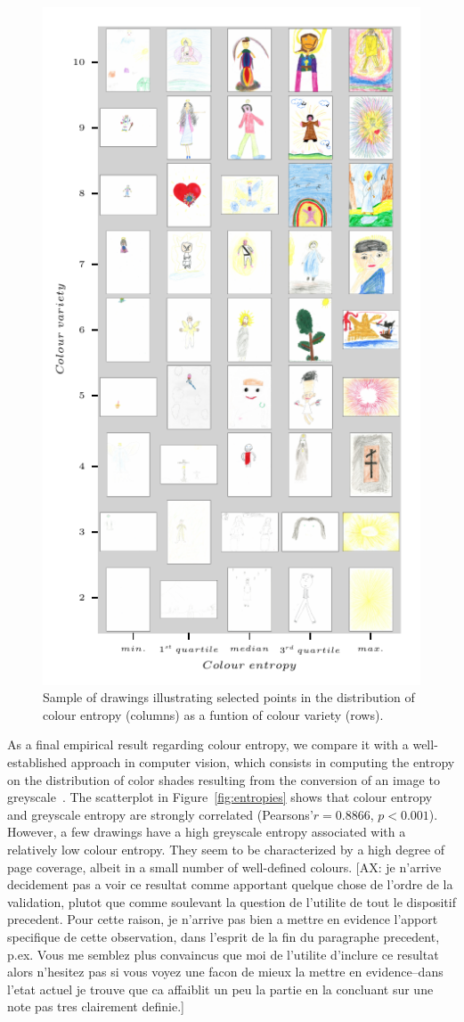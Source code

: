 \documentclass[11pt,a4paper]{article}
\begin{document}
\begin{figure}
	\centering
	\includegraphics[width=0.75\linewidth]{figures/colors-grille.pdf}
	\caption{Sample of drawings illustrating selected points in the distribution of colour entropy (columns) as a funtion of colour variety (rows).}
	\label{fig:grille}
\end{figure}

As a final empirical result regarding colour entropy, we compare it with a well-established approach in computer vision, which consists in computing the entropy on the distribution of color shades resulting from the conversion of an image to greyscale~\cite[see e.g.][]{wu2013}. The scatterplot in Figure~\ref{fig:entropies} shows that colour entropy and greyscale entropy are strongly correlated (Pearsons'$r=0.8866$, $p<0.001$). However, a few drawings have a high greyscale entropy associated with a relatively low colour entropy. They seem to be characterized by a high degree of page coverage, albeit in a small number of well-defined colours. {\color{green}[AX: je n'arrive decidement pas a voir ce resultat comme apportant quelque chose de l'ordre de la validation, plutot que comme soulevant la question de l'utilite de tout le dispositif precedent. Pour cette raison, je n'arrive pas bien a mettre en evidence l'apport specifique de cette observation, dans l'esprit de la fin du paragraphe precedent, p.ex. Vous me semblez plus convaincus que moi de l'utilite d'inclure ce resultat alors n'hesitez pas si vous voyez une facon de mieux la mettre en evidence--dans l'etat actuel je trouve que ca affaiblit un peu la partie en la concluant sur une note pas tres clairement definie.]} 
\end{document}
